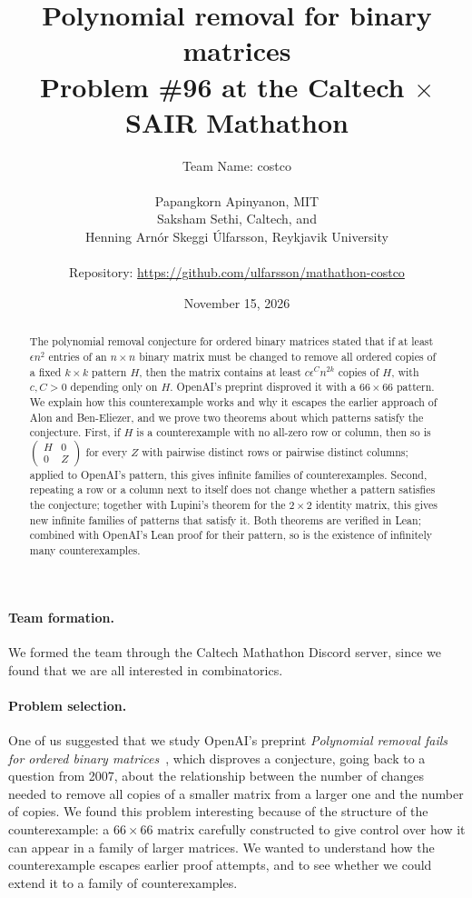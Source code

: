 \documentclass{article}
\title{Polynomial removal for binary matrices\\
\Large Problem \#96 at the Caltech $\times$ SAIR Mathathon}
\author{Team Name: costco\\
\,\\
Papangkorn Apinyanon, MIT\\
Saksham Sethi, Caltech, and\\
Henning Arn\'or Skeggi \'Ulfarsson, Reykjavik University\\
\,\\
\small Repository: \url{https://github.com/ulfarsson/mathathon-costco}}
\date{November 15, 2026}
\theoremstyle{plain}
\theoremstyle{definition}
\begin{document}
\maketitle

\begin{abstract}
The polynomial removal conjecture for ordered binary matrices stated that if at least $\epsilon n^2$
entries of an $n \times n$ binary matrix must be changed to remove all ordered copies of a fixed
$k \times k$ pattern $H$, then the matrix contains at least $c\epsilon^C n^{2k}$ copies of $H$, with
$c, C > 0$ depending only on $H$. OpenAI's preprint disproved it with a $66 \times 66$ pattern. We
explain how this counterexample works and why it escapes the earlier approach of Alon and
Ben-Eliezer, and we prove two theorems about which patterns satisfy the conjecture. First, if $H$
is a counterexample with no all-zero row or column, then so is
$\left(\begin{smallmatrix} H & 0 \\ 0 & Z \end{smallmatrix}\right)$ for every $Z$ with pairwise
distinct rows or pairwise distinct columns; applied to OpenAI's pattern, this gives infinite
families of counterexamples. Second, repeating a row or a column next to itself does not change
whether a pattern satisfies the conjecture; together with Lupini's theorem for the $2 \times 2$
identity matrix, this gives new infinite families of patterns that satisfy it. Both theorems are
verified in Lean; combined with OpenAI's Lean proof for their pattern, so is the existence of
infinitely many counterexamples.
\end{abstract}

\paragraph{Team formation.} We formed the team through the Caltech Mathathon Discord server, since we found that we are all interested in combinatorics.

\paragraph{Problem selection.} One of us suggested that we study OpenAI's preprint \emph{Polynomial removal fails for ordered binary matrices}~\cite{openai}, which disproves a conjecture, going back to a question from 2007, about the relationship between the number of changes needed to remove all copies of a smaller matrix from a larger one and the number of copies. We found this problem interesting because of the structure of the counterexample: a $66 \times 66$ matrix carefully constructed to give control over how it can appear in a family of larger matrices. We wanted to understand how the counterexample escapes earlier proof attempts, and to see whether we could extend it to a family of counterexamples.
\end{document}
